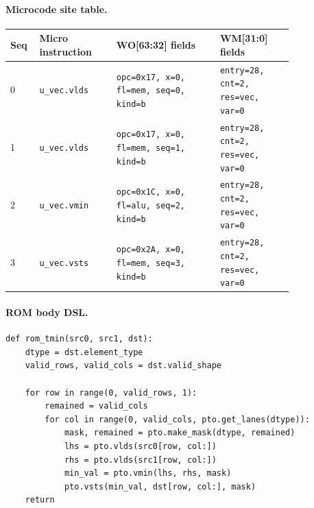 \paragraph{Microcode site table.}
{\scriptsize
\begin{longtable}{@{}R{0.055\linewidth}L{0.23\linewidth}L{0.31\linewidth}L{0.22\linewidth}@{}}
\toprule
Seq & Micro instruction & WO[63:32] fields & WM[31:0] fields \\
 & \texttt{u\_vec.vlds} & \texttt{opc=0x17, x=0, fl=mem, seq=0, kind=b} & \texttt{entry=28, cnt=2, res=vec, var=0} \\
1 & \texttt{u\_vec.vlds} & \texttt{opc=0x17, x=0, fl=mem, seq=1, kind=b} & \texttt{entry=28, cnt=2, res=vec, var=0} \\
2 & \texttt{u\_vec.vmin} & \texttt{opc=0x1C, x=0, fl=alu, seq=2, kind=b} & \texttt{entry=28, cnt=2, res=vec, var=0} \\
3 & \texttt{u\_vec.vsts} & \texttt{opc=0x2A, x=0, fl=mem, seq=3, kind=b} & \texttt{entry=28, cnt=2, res=vec, var=0} \\
\bottomrule
\end{longtable}
}
\paragraph{ROM body DSL.}
\begin{lstlisting}[style=ptocode]
def rom_tmin(src0, src1, dst):
    dtype = dst.element_type
    valid_rows, valid_cols = dst.valid_shape

    for row in range(0, valid_rows, 1):
        remained = valid_cols
        for col in range(0, valid_cols, pto.get_lanes(dtype)):
            mask, remained = pto.make_mask(dtype, remained)
            lhs = pto.vlds(src0[row, col:])
            rhs = pto.vlds(src1[row, col:])
            min_val = pto.vmin(lhs, rhs, mask)
            pto.vsts(min_val, dst[row, col:], mask)
    return
\end{lstlisting}
\Needspace{0.34\textheight}
